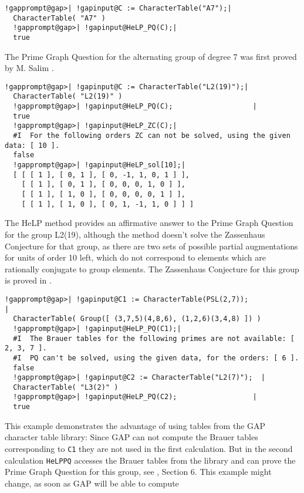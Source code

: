\documentclass[a4paper,11pt]{report}
\begin{document}
{{ 
\begin{Verbatim}[commandchars=!@|,fontsize=\small,frame=single,label=Example]
  !gapprompt@gap>| !gapinput@C := CharacterTable("A7");|
  CharacterTable( "A7" )
  !gapprompt@gap>| !gapinput@HeLP_PQ(C);|
  true
\end{Verbatim}
 The Prime Graph Question for the alternating group of degree 7 was first
proved by M. Salim \cite{SalimA7A8}. 
\begin{Verbatim}[commandchars=!@|,fontsize=\small,frame=single,label=Example]
  !gapprompt@gap>| !gapinput@C := CharacterTable("L2(19)");|
  CharacterTable( "L2(19)" )
  !gapprompt@gap>| !gapinput@HeLP_PQ(C);                   |
  true
  !gapprompt@gap>| !gapinput@HeLP_ZC(C);|
  #I  For the following orders ZC can not be solved, using the given data: [ 10 ].
  false
  !gapprompt@gap>| !gapinput@HeLP_sol[10];|
  [ [ [ 1 ], [ 0, 1 ], [ 0, -1, 1, 0, 1 ] ], 
    [ [ 1 ], [ 0, 1 ], [ 0, 0, 0, 1, 0 ] ], 
    [ [ 1 ], [ 1, 0 ], [ 0, 0, 0, 0, 1 ] ], 
    [ [ 1 ], [ 1, 0 ], [ 0, 1, -1, 1, 0 ] ] ]
\end{Verbatim}
 The HeLP method provides an affirmative answer to the Prime Graph Question for
the group L2(19), although the method doesn't solve the Zassenhaus Conjecture
for that group, as there are two sets of possible partial augmentations for
units of order 10 left, which do not correspond to elements which are
rationally conjugate to group elements. The Zassenhaus Conjecture for this
group is proved in \cite{BaMaM10}. 
\begin{Verbatim}[commandchars=!@|,fontsize=\small,frame=single,label=Example]
  !gapprompt@gap>| !gapinput@C1 := CharacterTable(PSL(2,7));                                  |
  CharacterTable( Group([ (3,7,5)(4,8,6), (1,2,6)(3,4,8) ]) )
  !gapprompt@gap>| !gapinput@HeLP_PQ(C1);|
  #I  The Brauer tables for the following primes are not available: [ 2, 3, 7 ].
  #I  PQ can't be solved, using the given data, for the orders: [ 6 ].
  false
  !gapprompt@gap>| !gapinput@C2 := CharacterTable("L2(7)");  |
  CharacterTable( "L3(2)" )
  !gapprompt@gap>| !gapinput@HeLP_PQ(C2);                  |
  true
\end{Verbatim}
 This example demonstrates the advantage of using tables from the GAP character
table library: Since GAP can not compute the Brauer tables corresponding to \texttt{C1} they are not used in the first calculation. But in the second calculation \texttt{HeLP{\textunderscore}PQ} accesses the Brauer tables from the library and can prove the Prime Graph
Question for this group, see \cite{HertweckBrauer}, Section 6. This example might change, as soon as GAP will be able to compute
}}
\end{document}
